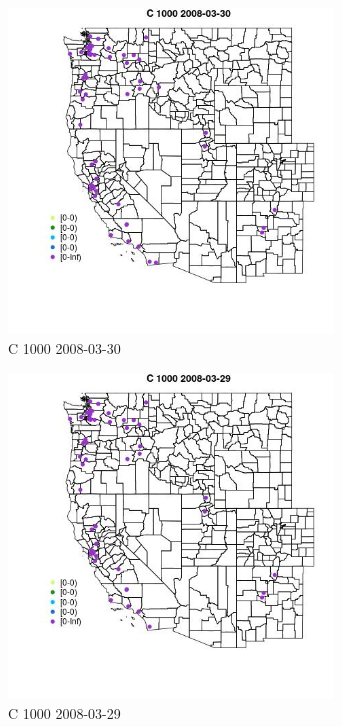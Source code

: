 \begin{figure} 
\centering  
\includegraphics[width=0.77\textwidth]{Code_Outputs/Report_ML_input_PM25_Step4_part_e_de_duplicated_aves_MapObsC_10002008-03-30.jpg} 
\caption{\label{fig:Report_ML_input_PM25_Step4_part_e_de_duplicated_avesMapObsC_10002008-03-30}C 1000 2008-03-30} 
\end{figure} 
 

\begin{figure} 
\centering  
\includegraphics[width=0.77\textwidth]{Code_Outputs/Report_ML_input_PM25_Step4_part_e_de_duplicated_aves_MapObsC_10002008-03-29.jpg} 
\caption{\label{fig:Report_ML_input_PM25_Step4_part_e_de_duplicated_avesMapObsC_10002008-03-29}C 1000 2008-03-29} 
\end{figure} 
 

